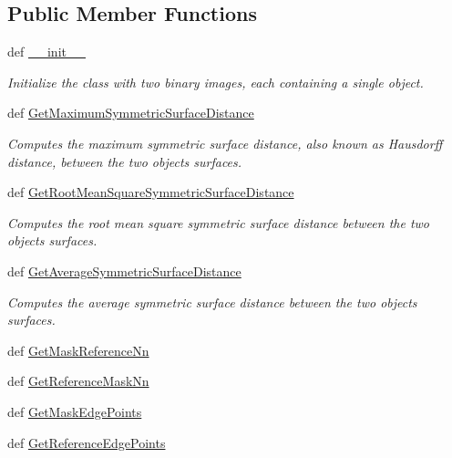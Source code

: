 \subsection*{Public Member Functions}
\begin{DoxyCompactItemize}
\item 
def \hyperlink{classmedpy_1_1metric_1_1surface_1_1Surface_a46994eacbac664bc6d33d19bac6f7b2c}{\_\-\_\-init\_\-\_\-}
\begin{DoxyCompactList}\small\item\em Initialize the class with two binary images, each containing a single object. \end{DoxyCompactList}\item 
def \hyperlink{classmedpy_1_1metric_1_1surface_1_1Surface_aebdeff8c2d6391c37572e5a791ed40f8}{GetMaximumSymmetricSurfaceDistance}
\begin{DoxyCompactList}\small\item\em Computes the maximum symmetric surface distance, also known as Hausdorff distance, between the two objects surfaces. \end{DoxyCompactList}\item 
def \hyperlink{classmedpy_1_1metric_1_1surface_1_1Surface_a43fc6c5bbe3af05e886341fc3cd6e4a6}{GetRootMeanSquareSymmetricSurfaceDistance}
\begin{DoxyCompactList}\small\item\em Computes the root mean square symmetric surface distance between the two objects surfaces. \end{DoxyCompactList}\item 
def \hyperlink{classmedpy_1_1metric_1_1surface_1_1Surface_a908c895052fb4ae5d6e85b0eb74af561}{GetAverageSymmetricSurfaceDistance}
\begin{DoxyCompactList}\small\item\em Computes the average symmetric surface distance between the two objects surfaces. \end{DoxyCompactList}\item 
def \hyperlink{classmedpy_1_1metric_1_1surface_1_1Surface_aa1286d971da183a1763d0756d35c90bd}{GetMaskReferenceNn}
\item 
def \hyperlink{classmedpy_1_1metric_1_1surface_1_1Surface_a1ddfc188d4a3c2e7bf3d9347fdec8b14}{GetReferenceMaskNn}
\item 
def \hyperlink{classmedpy_1_1metric_1_1surface_1_1Surface_a56381bbc209cbd46954ebc49e38d266c}{GetMaskEdgePoints}
\item 
def \hyperlink{classmedpy_1_1metric_1_1surface_1_1Surface_a7248264eca680d9c4d327961fd04c8be}{GetReferenceEdgePoints}
\end{DoxyCompactItemize}
